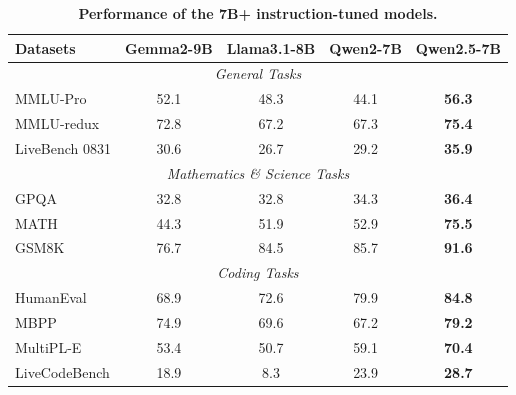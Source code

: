 \documentclass{article}
\begin{document}
\begin{table}[t]

\centering

\caption{\textbf{Performance of the 7B+ instruction-tuned models.}}

\label{tab:7b-instruct}
\small
\setlength{\tabcolsep}{2.6pt}

\begin{tabular}{@{}lcccc@{}}

\toprule

\textbf{Datasets} & \textbf{Gemma2-9B} & \textbf{Llama3.1-8B} & \textbf{Qwen2-7B} & \textbf{Qwen2.5-7B} \\

\midrule

\multicolumn{5}{c}{\textit{General Tasks}} \\

\midrule

MMLU-Pro & 52.1 & 48.3 & 44.1 & \textbf{56.3} \\

MMLU-redux & 72.8 & 67.2 & 67.3 & \textbf{75.4} \\

LiveBench 0831 & 30.6 & 26.7 & 29.2 & \textbf{35.9} \\

\midrule

\multicolumn{5}{c}{\textit{Mathematics \& Science Tasks}} \\

\midrule

GPQA & 32.8 & 32.8 & 34.3 & \textbf{36.4} \\

MATH & 44.3 & 51.9 & 52.9 & \textbf{75.5} \\

GSM8K & 76.7 & 84.5 & 85.7 & \textbf{91.6} \\

\midrule

\multicolumn{5}{c}{\textit{Coding Tasks}} \\

\midrule

HumanEval & 68.9 & 72.6 & 79.9 & \textbf{84.8} \\

MBPP & 74.9 & 69.6 & 67.2 & \textbf{79.2} \\

MultiPL-E & 53.4 & 50.7 & 59.1 & \textbf{70.4} \\

LiveCodeBench & 18.9 & 8.3 & 23.9 & \textbf{28.7} \\


\end{tabular}
\end{table}
\end{document}
